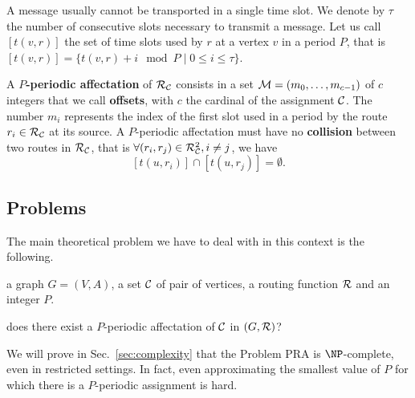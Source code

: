 \documentclass[a4paper,10pt]{article}
\begin{document}
      A message usually cannot be transported in a single time slot. We denote by $\tau$ the number 
      of consecutive slots necessary to transmit a message. Let us call $[t(v,r)]$ the set of time slots used by $r$ at a vertex $v$ in a period $P$, that is $[t(v,r)] = \{t(v,r) + i \mod P \mid 0 \leq i \leq \tau \}$.
      
      
      A {\bf $P$-periodic affectation} of $\cal R_{\cal C}$ consists in a set  ${\cal M}=(m_0, \ldots ,m_{c-1})$ of $c$ integers that we call {\bf offsets}, with $c$ the cardinal of the assignment $\cal C$. The number $m_i$ represents the index of the first slot used in a period  by the route $r_i \in {\cal R}_{\cal C}$ at its source.
      A $P$-periodic affectation must have no {\bf collision} between two routes in ${\cal R}_{\cal C}$, that is $\forall (r_i, r_j) \in {\cal R}_{\cal C}^2, i \neq j$, %
      we have $$[t(u,r_i)] \cap [t(u,r_j)] = \emptyset .$$
      
   \subsection{Problems}

      The main theoretical problem we have to deal with in this context is the following.\\


       a graph $G=(V,A)$, a set $\cal C$ of pair of vertices, a routing function $\cal R$ and an integer $P$.

       does there exist a $P$-periodic affectation of $\cal C$ in $(G,{\cal R})$?

      We will prove in Sec.~\ref{sec:complexity} that the Problem PRA is $\NP$-complete, even in restricted settings.
      In fact, even approximating the smallest value of $P$ for which there is a $P$-periodic assignment is hard.\\
% 
\end{document}
